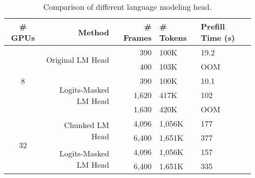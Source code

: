 \begin{table*}[!htbp]
	\caption{
		Comparison of different language modeling head.
	}
	\begin{center}
		\begin{adjustbox}{max width=0.99\textwidth}
			\begin{tabular}{c|r|rl|l}
				\toprule
				
				
				\# GPUs & Method & \# Frames & \# Tokens & Prefill Time (s) \\
				
				\midrule
				\multirow{5}{*}{8}
				
				&\multirow{2}{*}{Original LM Head}
				& 390 & 100K & 19.2 \\
				
				&& 400 & 103K & OOM \\
				
				
				\cmidrule{2-5}
				
				& \multirow{3}{*}{Logits-Masked LM Head}
				& 390 & 100K & 10.1 \color{red}{ ( $\downarrow$ 47.3\% ) } \\
				&& 1,620 & 417K \color{red}{ ( $\uparrow$ 417\% ) } & 102 \\
				&& 1,630 & 420K & OOM \\
				
				\midrule
				
				\multirow{4}{*}{32}
				
				& \multirow{2}{*}{Chunked LM Head}
				& 4,096 & 1,056K & 177 \\
				&& 6,400 & 1,651K & 377 \\
				
				\cmidrule{2-5}
				
				& \multirow{2}{*}{Logits-Masked LM Head}
				& 4,096 & 1,056K & 157 \color{red}{ ( $\downarrow$ 11.3\% ) } \\
				&& 6,400 & 1,651K & 335 \color{red}{ ( $\downarrow$ 11.1\% ) } \\
				
				
				
				
				\bottomrule%
			\end{tabular}
		\end{adjustbox}
	\end{center}
	\label{table_lm_head}
\end{table*}